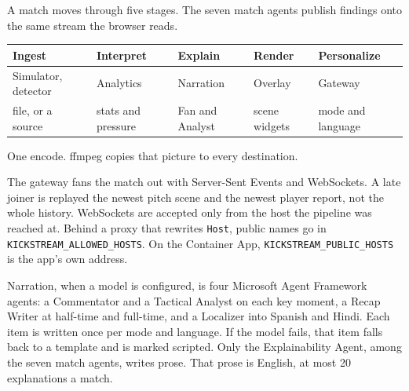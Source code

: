 \documentclass[11pt]{article}
\begin{document}
A match moves through five stages. The seven match agents publish findings onto
the same stream the browser reads.

\begin{center}
\small
\begin{tabular}{@{}lllll@{}}
\toprule
Ingest & Interpret & Explain & Render & Personalize \\
\midrule
Simulator, detector & Analytics & Narration & Overlay & Gateway \\
file, or a source & stats and pressure & Fan and Analyst & scene widgets & mode and language \\
\bottomrule
\end{tabular}
\end{center}

\begin{center}
\end{center}
{\small\color{Muted} One encode. ffmpeg copies that picture to every destination.\par}

The gateway fans the match out with Server-Sent Events and WebSockets.
A late joiner is replayed the newest pitch scene and the newest player report, not the whole history.
WebSockets are accepted only from the host the pipeline was reached at.
Behind a proxy that rewrites \texttt{Host}, public names go in \texttt{KICKSTREAM\_ALLOWED\_HOSTS}.
On the Container App, \texttt{KICKSTREAM\_PUBLIC\_HOSTS} is the app's own address.

Narration, when a model is configured, is four Microsoft Agent Framework agents:
a Commentator and a Tactical Analyst on each key moment, a Recap Writer at
half-time and full-time, and a Localizer into Spanish and Hindi.
Each item is written once per mode and language.
If the model fails, that item falls back to a template and is marked scripted.
Only the Explainability Agent, among the seven match agents, writes prose.
That prose is English, at most 20 explanations a match.
\end{document}
